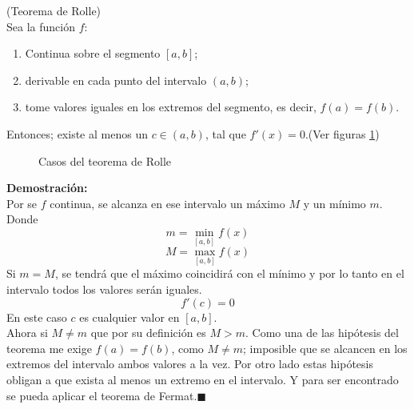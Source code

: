 \documentclass[10pt,twoside]{SelfArx} %
\begin{document}
\begin{teorema}
	(Teorema de Rolle)\\
	Sea la función $ f $:
	\begin{enumerate}
		\item Continua sobre el segmento $ [a,b] $;
		\item derivable en cada punto del intervalo $ (a,b) $;
		\item tome valores iguales en los extremos del segmento, es decir, $ f(a)=f(b) $.
	\end{enumerate}
	Entonces; existe al menos un $ c\in(a,b) $, tal que $ f'(x)=0 $.(Ver figuras \ref{rolle})
\end{teorema}
\begin{figure}[h]
\centering
{}
\caption{Casos del teorema de Rolle}
\label{rolle}
\end{figure}
 \textbf{Demostración:}\\
 Por se $ f $ continua, se alcanza en ese intervalo un máximo $ M $ y un mínimo $ m $. Donde 
 \[ m=\min_{[a,b]}f(x) \]
 \[ M=\max_{[a,b]}f(x) \]
 Si $ m=M $, se tendr\'a que el máximo coincidirá con el mínimo y por lo tanto en el intervalo todos los valores serán iguales.
 \begin{equation}
 f'(c)=0
 \end{equation}
 En este caso $ c $ es cualquier valor en $ [a,b] $.\\
 Ahora si $ M\neq m $ que por su definici\'on es $ M>m $. Como una de las hipótesis del teorema me exige $ f(a)=f(b) $, como $ M\neq m $; imposible que se alcancen en los extremos del intervalo ambos valores a la vez. Por otro lado estas hipótesis obligan a que exista al menos un extremo en el intervalo. Y para ser encontrado se pueda aplicar el teorema de Fermat.$ \blacksquare $
 
\end{document}
